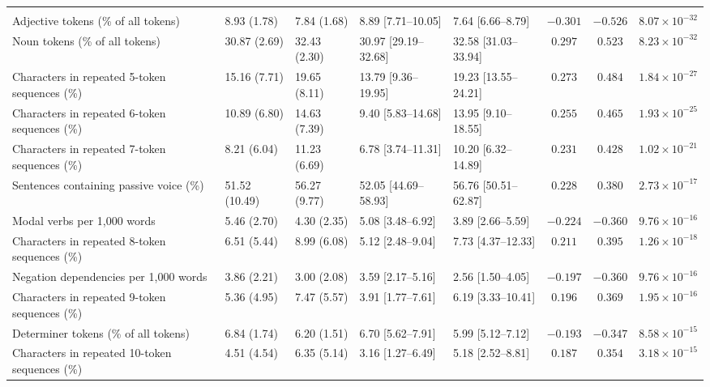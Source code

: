 \begin{landscape}
\begin{longtable}{@{}p{5.2cm}p{2.65cm}p{2.65cm}p{2.85cm}p{2.85cm}ccc@{}}
\bottomrule
\endlastfoot
\rowcolor{blue!10}
\multicolumn{8}{@{}l}{\textbf{Statistically significant after BH correction ($q < .05$; 57 features)}} \\
\addlinespace[2pt]
Adjective tokens (\% of all tokens) & 8.93 (1.78) & 7.84 (1.68) & 8.89 [7.71--10.05] & 7.64 [6.66--8.79] & $-0.301$ & $-0.526$ & $8.07 \times 10^{-32}$ \\
Noun tokens (\% of all tokens) & 30.87 (2.69) & 32.43 (2.30) & 30.97 [29.19--32.68] & 32.58 [31.03--33.94] & $0.297$ & $0.523$ & $8.23 \times 10^{-32}$ \\
Characters in repeated 5-token sequences (\%) & 15.16 (7.71) & 19.65 (8.11) & 13.79 [9.36--19.95] & 19.23 [13.55--24.21] & $0.273$ & $0.484$ & $1.84 \times 10^{-27}$ \\
Characters in repeated 6-token sequences (\%) & 10.89 (6.80) & 14.63 (7.39) & 9.40 [5.83--14.68] & 13.95 [9.10--18.55] & $0.255$ & $0.465$ & $1.93 \times 10^{-25}$ \\
Characters in repeated 7-token sequences (\%) & 8.21 (6.04) & 11.23 (6.69) & 6.78 [3.74--11.31] & 10.20 [6.32--14.89] & $0.231$ & $0.428$ & $1.02 \times 10^{-21}$ \\
Sentences containing passive voice (\%) & 51.52 (10.49) & 56.27 (9.77) & 52.05 [44.69--58.93] & 56.76 [50.51--62.87] & $0.228$ & $0.380$ & $2.73 \times 10^{-17}$ \\
Modal verbs per 1,000 words & 5.46 (2.70) & 4.30 (2.35) & 5.08 [3.48--6.92] & 3.89 [2.66--5.59] & $-0.224$ & $-0.360$ & $9.76 \times 10^{-16}$ \\
Characters in repeated 8-token sequences (\%) & 6.51 (5.44) & 8.99 (6.08) & 5.12 [2.48--9.04] & 7.73 [4.37--12.33] & $0.211$ & $0.395$ & $1.26 \times 10^{-18}$ \\
Negation dependencies per 1,000 words & 3.86 (2.21) & 3.00 (2.08) & 3.59 [2.17--5.16] & 2.56 [1.50--4.05] & $-0.197$ & $-0.360$ & $9.76 \times 10^{-16}$ \\
Characters in repeated 9-token sequences (\%) & 5.36 (4.95) & 7.47 (5.57) & 3.91 [1.77--7.61] & 6.19 [3.33--10.41] & $0.196$ & $0.369$ & $1.95 \times 10^{-16}$ \\
Determiner tokens (\% of all tokens) & 6.84 (1.74) & 6.20 (1.51) & 6.70 [5.62--7.91] & 5.99 [5.12--7.12] & $-0.193$ & $-0.347$ & $8.58 \times 10^{-15}$ \\
Characters in repeated 10-token sequences (\%) & 4.51 (4.54) & 6.35 (5.14) & 3.16 [1.27--6.49] & 5.18 [2.52--8.81] & $0.187$ & $0.354$ & $3.18 \times 10^{-15}$ \\

\end{longtable}
\end{landscape}
